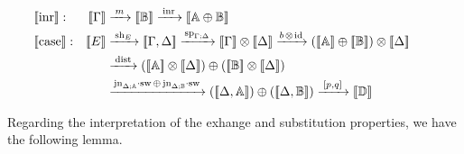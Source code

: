 \begin{align*}
    &\hspace{-20pt}\llbracket \text{inr} \rrbracket : & [\![\Gamma]\!] & \xrightarrow{\hspace{2pt} m \hspace{2pt}} \llbracket \mathbb{B} \rrbracket \xrightarrow{\hspace{2pt}\inr \hspace{2pt}} \llbracket \typeA \oplus \typeB \rrbracket\\
    &\hspace{-20pt}\llbracket \text{case} \rrbracket : & [\![E]\!] & \xrightarrow{\hspace{2pt}\text{sh}_{E}\hspace{2pt}}   [\![\Gamma,\Delta ]\!]   \xrightarrow{\hspace{1pt}\text{sp}_{\Gamma;\Delta}\hspace{1pt}}  [\![\Gamma ]\!] \otimes [\![\Delta ]\!] \xrightarrow{ b \hspace{1pt} \otimes \hspace{1pt} \id} ([\![\mathbb{A} ]\!] \oplus[\![\mathbb{B} ]\!]) \otimes [\![\Delta ]\!]   \\
     & &  &\xrightarrow{\hspace{2pt}\dist\hspace{1pt}} \left([\![\mathbb{A} ]\!] \otimes [\![\Delta ]\!]\right) \oplus \left([\![\mathbb{B} ]\!] \otimes [\![\Delta ]\!]\right)  \\
     & & &  \xrightarrow{\hspace{1pt}\text{jn}_{\Delta;\typeA}\comp \sw \,\oplus  \, \text{jn}_{\Delta;\typeB}\comp \sw\hspace{1pt}}  \left([\![ \Delta,\mathbb{A}]\!]\right) \oplus \left([\![\Delta, \mathbb{B} ]\!]\right) \xrightarrow{\hspace{2pt}[p,q]\hspace{2pt}} \llbracket \mathbb{D} \rrbracket \\
\end{align*} 


Regarding the interpretation of the exhange and substitution properties, we have the following lemma.

